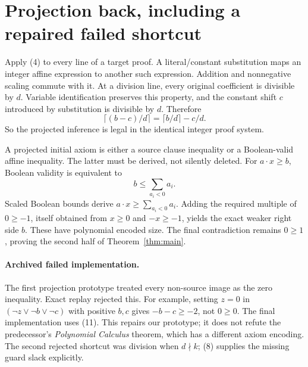 \documentclass[11pt]{article}
\begin{document}
\section{Projection back, including a repaired failed shortcut}
Apply (4) to every line of a target proof. A literal/constant substitution
maps an integer affine expression to another such expression. Addition and
nonnegative scaling commute with it. At a division line, every original
coefficient is divisible by $d$. Variable identification preserves this
property, and the constant shift $c$ introduced by substitution is divisible
by $d$. Therefore
\[
                   \lceil(b-c)/d\rceil=\lceil b/d\rceil-c/d.          \tag{10}
\]
So the projected inference is legal in the identical integer proof system.

A projected initial axiom is either a source clause inequality or a
Boolean-valid affine inequality. The latter must be derived, not silently
deleted. For $a\cdot x\ge b$, Boolean validity is equivalent to
\[
                     b\le\sum_{a_i<0} a_i.                          \tag{11}
\]
Scaled Boolean bounds derive $a\cdot x\ge\sum_{a_i<0}a_i$.
Adding the required multiple of $0\ge-1$, itself obtained from
$x\ge0$ and $-x\ge-1$, yields the exact weaker right side $b$.
These have polynomial encoded size. The final contradiction remains
$0\ge1$, proving the second half of Theorem~\ref{thm:main}.

\paragraph{Archived failed implementation.}
The first projection prototype treated every non-source image as the zero
inequality. Exact replay rejected this. For example, setting $z=0$ in
$(\neg z\lor\neg b\lor\neg c)$ with positive $b,c$ gives
$-b-c\ge-2$, not $0\ge0$. The final implementation uses (11).
This repairs our prototype; it does not refute the predecessor's
\emph{Polynomial Calculus} theorem, which has a different axiom encoding.
The second rejected shortcut was division when $d\nmid k$; (8) supplies the
missing guard slack explicitly.
\end{document}
